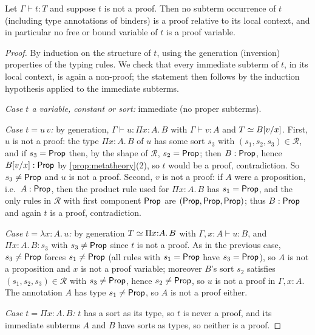 \begin{lemma}
\label{lem:proof-confinement}
Let $\Gamma \vdash t : T$ and suppose $t$ is not a proof.  Then no
subterm occurrence of $t$ (including type annotations of binders) is
a proof relative to its local context, and in particular no free or
bound variable of $t$ is a proof variable.
\end{lemma}

\begin{proof}
By induction on the structure of $t$, using the generation
(inversion) properties of the typing rules.  We check that every
immediate subterm of $t$, in its local context, is again a non-proof;
the statement then follows by the induction hypothesis applied to the
immediate subterms.

\emph{Case $t$ a variable, constant or sort:} immediate (no proper
subterms).

\emph{Case $t = u\,v$:} by generation, $\Gamma \vdash u : \Pi
x{:}A.\,B$ with $\Gamma \vdash v : A$ and $T \simeq B[v/x]$.  First,
$u$ is not a proof: the type $\Pi x{:}A.\,B$ of $u$ has some sort
$s_3$ with $(s_1, s_2, s_3) \in \mathcal{R}$, and if $s_3 = \mathsf{Prop}$
then, by the shape of $\mathcal{R}$, $s_2 = \mathsf{Prop}$; then $B :
\mathsf{Prop}$, hence $B[v/x] : \mathsf{Prop}$ by
\cref{prop:metatheory}(2), so $t$ would be a proof, contradiction.
So $s_3 \neq \mathsf{Prop}$ and $u$ is not a proof.  Second, $v$ is not a
proof: if $A$ were a proposition, i.e.\ $A : \mathsf{Prop}$, then the
product rule used for $\Pi x{:}A.\,B$ has $s_1 = \mathsf{Prop}$, and the
only rules in $\mathcal{R}$ with first component $\mathsf{Prop}$ are
$(\mathsf{Prop}, \mathsf{Prop}, \mathsf{Prop})$; thus $B : \mathsf{Prop}$ and again $t$ is a
proof, contradiction.

\emph{Case $t = \lambda x{:}A.\,u$:} by generation $T \simeq \Pi
x{:}A.\,B$ with $\Gamma, x{:}A \vdash u : B$, and $\Pi x{:}A.\,B : s_3$
with $s_3 \neq \mathsf{Prop}$ since $t$ is not a proof.  As in the previous
case, $s_3 \neq \mathsf{Prop}$ forces $s_1 \neq \mathsf{Prop}$ (all rules with
$s_1 = \mathsf{Prop}$ have $s_3 = \mathsf{Prop}$), so $A$ is not a proposition and
$x$ is not a proof variable; moreover $B$'s sort $s_2$ satisfies
$(s_1, s_2, s_3) \in \mathcal{R}$ with $s_3 \neq \mathsf{Prop}$, hence $s_2
\neq \mathsf{Prop}$, so $u$ is not a proof in $\Gamma, x{:}A$.  The
annotation $A$ has type $s_1 \neq \mathsf{Prop}$, so $A$ is not a proof
either.

\emph{Case $t = \Pi x{:}A.\,B$:} $t$ has a sort as its type, so $t$
is never a proof, and its immediate subterms $A$ and $B$ have sorts
as types, so neither is a proof.


\end{proof}
